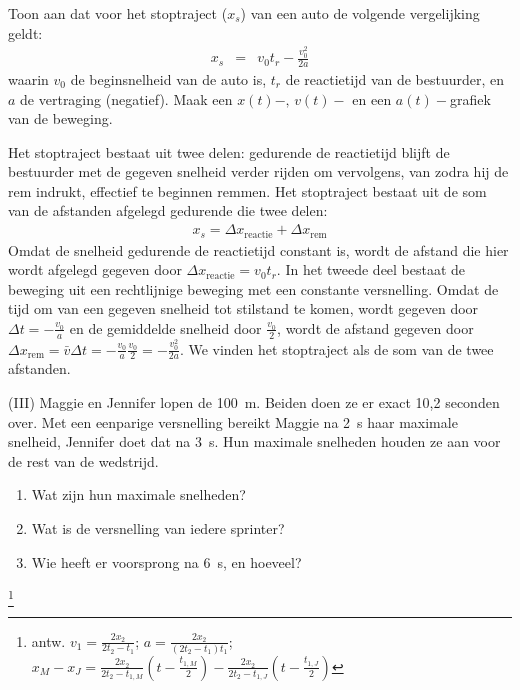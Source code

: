 \begin{exercise} Toon aan dat voor het stoptraject ($x_s$) van een auto de volgende vergelijking geldt:
\begin{eqnarray*}
x_s&=&v_0t_r-\frac{v_0^2}{2a}
\end{eqnarray*}
waarin $v_0$ de beginsnelheid van de auto is, $t_r$ de reactietijd van de bestuurder, en $a$ de vertraging (negatief).
\newline
\newline
Maak een $x(t)-,\,v(t)-$ en een $a(t)-$grafiek van de beweging.
\begin{oplossing}
\newline
\newline
Het stoptraject bestaat uit twee delen: gedurende de reactietijd blijft de bestuurder met de gegeven snelheid verder rijden om vervolgens, van zodra hij de rem indrukt, effectief te beginnen remmen. Het stoptraject bestaat uit de som van de afstanden afgelegd gedurende die twee delen:
\begin{eqnarray*}
x_s=\Delta x_{\mathrm{reactie}}+\Delta x_{\mathrm{rem}}
\end{eqnarray*}
Omdat de snelheid gedurende de reactietijd constant is, wordt de afstand die hier wordt afgelegd gegeven door $\Delta x_{\mathrm{reactie}}=v_0t_r$. In het tweede deel bestaat de beweging uit een rechtlijnige beweging met een constante versnelling. Omdat de tijd om van een gegeven snelheid tot stilstand te komen, wordt gegeven door $\Delta t=-\frac{v_0}{a}$ en de gemiddelde snelheid door $\frac{v_0}{2}$, wordt de afstand gegeven door $\Delta x_{\mathrm{rem}}=\bar{v}\Delta t=-\frac{v_0}{a}\frac{v_0}{2}=-\frac{v_0^2}{2a}$. We vinden het stoptraject als de som van de twee afstanden.
\end{oplossing}



\end{exercise}

\begin{exercise} (III) Maggie en Jennifer lopen de \SI{100}{m}. Beiden doen ze er exact 10,2 se\-conden over. Met een eenparige versnelling bereikt Maggie na \SI{2}{s} haar maximale snelheid, Jennifer doet dat na \SI{3}{s}. Hun maximale snelheden houden ze aan voor de rest van de wedstrijd.
\begin{enumerate}
\item Wat zijn hun maximale snelheden?
\item Wat is de versnelling van iedere sprinter?
\item Wie heeft er voorsprong na \SI{6}{s}, en hoeveel?
\end{enumerate}
\begin{oplossing}
\footnote{antw. $v_1=\frac{2x_2}{2t_2-t_1}$;
$a=\frac{2x_2}{(2t_2-t_1)t_1}$;
$x_M-x_J=\frac{2x_2}{2t_2-t_{1,M}}(t-\frac{t_{1,M}}{2})-\frac{2x_2}{2t_2-t_{1,J}}(t-\frac{t_{1,J}}{2})$}
\end{oplossing}

\end{exercise}

